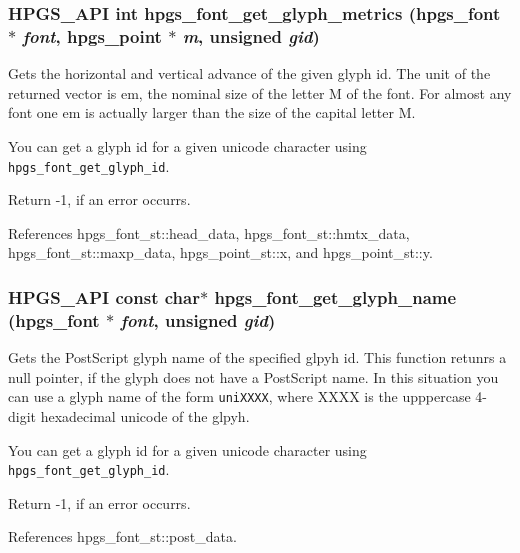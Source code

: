 \subsubsection[hpgs\_\-font\_\-get\_\-glyph\_\-metrics]{\setlength{\rightskip}{0pt plus 5cm}HPGS\_\-API int hpgs\_\-font\_\-get\_\-glyph\_\-metrics ({\bf hpgs\_\-font} $\ast$ {\em font}, \/  {\bf hpgs\_\-point} $\ast$ {\em m}, \/  unsigned {\em gid})}\label{group__font_g56eca584198b3a74e06929a036f6ea8a}


Gets the horizontal and vertical advance of the given glyph id. The unit of the returned vector is em, the nominal size of the letter M of the font. For almost any font one em is actually larger than the size of the capital letter M.

You can get a glyph id for a given unicode character using {\tt hpgs\_\-font\_\-get\_\-glyph\_\-id}.

Return -1, if an error occurrs. 

References hpgs\_\-font\_\-st::head\_\-data, hpgs\_\-font\_\-st::hmtx\_\-data, hpgs\_\-font\_\-st::maxp\_\-data, hpgs\_\-point\_\-st::x, and hpgs\_\-point\_\-st::y.
\subsubsection[hpgs\_\-font\_\-get\_\-glyph\_\-name]{\setlength{\rightskip}{0pt plus 5cm}HPGS\_\-API const char$\ast$ hpgs\_\-font\_\-get\_\-glyph\_\-name ({\bf hpgs\_\-font} $\ast$ {\em font}, \/  unsigned {\em gid})}\label{group__font_g85f387b7ff799d031d1f1bf91d441cae}


Gets the PostScript glyph name of the specified glpyh id. This function retunrs a null pointer, if the glyph does not have a PostScript name. In this situation you can use a glyph name of the form {\tt uniXXXX}, where XXXX is the upppercase 4-digit hexadecimal unicode of the glpyh.

You can get a glyph id for a given unicode character using {\tt hpgs\_\-font\_\-get\_\-glyph\_\-id}.

Return -1, if an error occurrs. 

References hpgs\_\-font\_\-st::post\_\-data.
